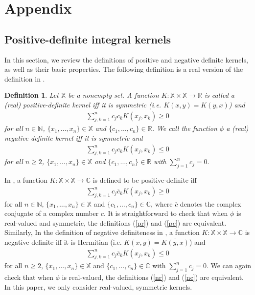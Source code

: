 \documentclass[]{elsarticle}
\newtheorem{definition}[theorem]{Definition}
\numberwithin{equation}{section}
\numberwithin{theorem}{section}
\newcommand\RR{{\mathbb R}}
\newcommand\NN{{\mathbb N}}
\newcommand\CC{{\mathbb C}}
\begin{document}
\appendix
\renewcommand*{\thesection}{\Alph{section}}
\section{Appendix}\label{sec:append}
\subsection{Positive-definite integral kernels}

In this section, we review the definitions of positive and negative definite kernels, as well as their basic properties. The following definition is a real version of the definition in \cite[p.67]{BCR84}.

\begin{definition}\label{def_spd}
Let $\mathbb{X}$ be a nonempty set. A function $K:  \mathbb{X}\times \mathbb{X}\rightarrow \RR$ is called a (real) positive-definite kernel iff it is symmetric (i.e. $K(x,y)=K(y,x)$) and
\begin{eqnarray}
\sum_{j,k=1}^{n}c_jc_k K(x_j,x_k)\geq 0\label{pr}
\end{eqnarray}
for all $n\in \NN$, $\{x_1,\ldots,x_n\}\in \mathbb{X}$ and $\{c_1,\ldots,c_n\}\in \RR$. We call the function $\phi$ a (real) negative definite kernel iff it is symmetric and
\begin{eqnarray}
\sum_{j,k=1}^{n}c_jc_k  K(x_j,x_k)\leq 0\label{nr}
\end{eqnarray}
for all $n\geq 2$, $\{x_1,\ldots,x_n\}\in \mathbb{X}$ and $\{c_1,\ldots,c_n\}\in \RR$ with $\sum_{j=1}^{n}c_j=0.$
\end{definition}

 In \cite[p.67]{BCR84}, a function $K: \mathbb{X}\times \mathbb{X}\rightarrow \CC$ is defined to be positive-definite iff 
\begin{eqnarray}
\sum_{j,k=1}^{n}c_j\overline{c}_k K(x_j,x_k)\geq 0\label{pc}
\end{eqnarray}
for all $n\in \NN$, $\{x_1,\ldots,x_n\}\in \mathbb{X}$ and $\{c_1,\ldots,c_n\}\in \CC$, where $\overline{c}$ denotes the complex conjugate of a complex number $c$. It is straightforward to check that when $\phi$ is real-valued and symmetric, the definitions (\ref{pr}) and (\ref{pc}) are equivalent. Similarly, In the definition of negative definiteness in \cite[p.67]{BCR84}, a function $K: \mathbb{X}\times \mathbb{X}\rightarrow \CC$ is negative definite iff it is Hermitian (i.e. $ K(x,y)=\overline{ K(y,x)}$) and 
\begin{eqnarray}
\sum_{j,k=1}^{n}c_j\overline{c}_k K(x_j,x_k)\leq 0\label{nc}
\end{eqnarray}
for all $n\geq 2$, $\{x_1,\ldots,x_n\}\in \mathbb{X}$ and $\{c_1,\ldots,c_n\}\in \CC$ with $\sum_{j=1}^{n}c_j=0$. We can again check that when $\phi$ is real-valued, the definitions (\ref{nr}) and (\ref{nc}) are equivalent. In this paper, we only consider real-valued, symmetric kernels.
\end{document}
